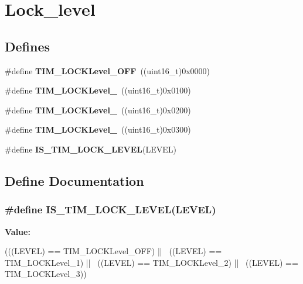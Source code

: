 \hypertarget{group__Lock__level}{
\section{Lock\_\-level}
\label{group__Lock__level}
}
\subsection*{Defines}
\begin{DoxyCompactItemize}
\item 
\hypertarget{group__Lock__level_ga84d318c62d3e5dfe7082610d03e11f2f}{
\#define {\bfseries TIM\_\-LOCKLevel\_\-OFF}~((uint16\_\-t)0x0000)}
\label{group__Lock__level_ga84d318c62d3e5dfe7082610d03e11f2f}

\item 
\hypertarget{group__Lock__level_ga7e4326fc7756ebf5e9eb9776c2734aea}{
\#define {\bfseries TIM\_\-LOCKLevel\_}~((uint16\_\-t)0x0100)}
\label{group__Lock__level_ga7e4326fc7756ebf5e9eb9776c2734aea}

\item 
\hypertarget{group__Lock__level_ga91bdf218f766e6a10b7a7df407250d25}{
\#define {\bfseries TIM\_\-LOCKLevel\_}~((uint16\_\-t)0x0200)}
\label{group__Lock__level_ga91bdf218f766e6a10b7a7df407250d25}

\item 
\hypertarget{group__Lock__level_gaa0a0c1ffd9dc582d6571780c1747920b}{
\#define {\bfseries TIM\_\-LOCKLevel\_}~((uint16\_\-t)0x0300)}
\label{group__Lock__level_gaa0a0c1ffd9dc582d6571780c1747920b}

\item 
\#define {\bfseries IS\_\-TIM\_\-LOCK\_\-LEVEL}(LEVEL)
\end{DoxyCompactItemize}


\subsection{Define Documentation}
\hypertarget{group__Lock__level_gacf5e70717f6d13af301331bb043f5d48}{
\subsubsection[{IS\_\-TIM\_\-LOCK\_\-LEVEL}]{\setlength{\rightskip}{0pt plus 5cm}\#define IS\_\-TIM\_\-LOCK\_\-LEVEL(LEVEL)}}
\label{group__Lock__level_gacf5e70717f6d13af301331bb043f5d48}
{\bfseries Value:}
\begin{DoxyCode}
(((LEVEL) == TIM_LOCKLevel_OFF) || \
                                  ((LEVEL) == TIM_LOCKLevel_1) || \
                                  ((LEVEL) == TIM_LOCKLevel_2) || \
                                  ((LEVEL) == TIM_LOCKLevel_3))
\end{DoxyCode}
